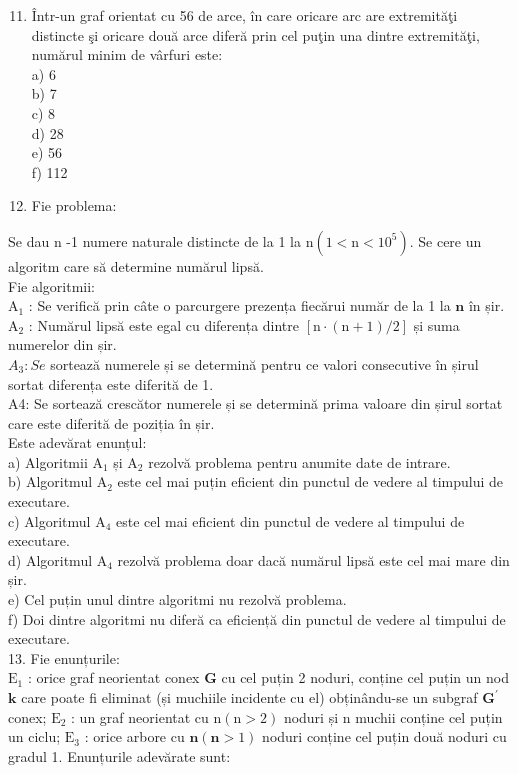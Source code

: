 \documentclass[10pt]{article}
\begin{document}
\begin{enumerate}
  \setcounter{enumi}{10}
  \item Într-un graf orientat cu 56 de arce, în care oricare arc are extremităţi distincte şi oricare două arce diferă prin cel puţin una dintre extremităţi, numărul minim de vârfuri este:\\
a) 6\\
b) 7\\
c) 8\\
d) 28\\
e) 56\\
f) 112
  \item Fie problema:
\end{enumerate}

Se dau n -1 numere naturale distincte de la 1 la $\mathrm{n}\left(1<\mathrm{n}<10^{5}\right)$. Se cere un algoritm care să determine numărul lipsă.\\
Fie algoritmii:\\
$\mathrm{A}_{1}$ : Se verifică prin câte o parcurgere prezența fiecărui număr de la 1 la $\mathbf{n}$ în șir.\\
$\mathrm{A}_{2}$ : Numărul lipsă este egal cu diferența dintre $[\mathrm{n} \cdot(\mathrm{n}+1) / 2]$ și suma numerelor din șir.\\
$A_{3}: S e$ sortează numerele și se determină pentru ce valori consecutive în șirul sortat diferența este diferită de 1.\\
A4: Se sortează crescător numerele și se determină prima valoare din șirul sortat care este diferită de poziția în șir.\\
Este adevărat enunțul:\\
a) Algoritmii $\mathrm{A}_{1}$ și $\mathrm{A}_{2}$ rezolvă problema pentru anumite date de intrare.\\
b) Algoritmul $\mathrm{A}_{2}$ este cel mai puțin eficient din punctul de vedere al timpului de executare.\\
c) Algoritmul $\mathrm{A}_{4}$ este cel mai eficient din punctul de vedere al timpului de executare.\\
d) Algoritmul $\mathrm{A}_{4}$ rezolvă problema doar dacă numărul lipsă este cel mai mare din șir.\\
e) Cel puțin unul dintre algoritmi nu rezolvă problema.\\
f) Doi dintre algoritmi nu diferă ca eficiență din punctul de vedere al timpului de executare.\\
13. Fie enunțurile:\\
$\mathrm{E}_{1}$ : orice graf neorientat conex $\mathbf{G}$ cu cel puțin 2 noduri, conține cel puțin un nod $\mathbf{k}$ care poate fi eliminat (și muchiile incidente cu el) obținându-se un subgraf $\mathbf{G}^{\prime}$ conex; $\mathrm{E}_{2}$ : un graf neorientat cu $\mathrm{n}(\mathrm{n}>2)$ noduri și n muchii conține cel puțin un ciclu; $\mathrm{E}_{3}$ : orice arbore cu $\mathbf{n}(\mathbf{n}>1)$ noduri conține cel puțin două noduri cu gradul 1. Enunțurile adevărate sunt:\\
\end{document}
